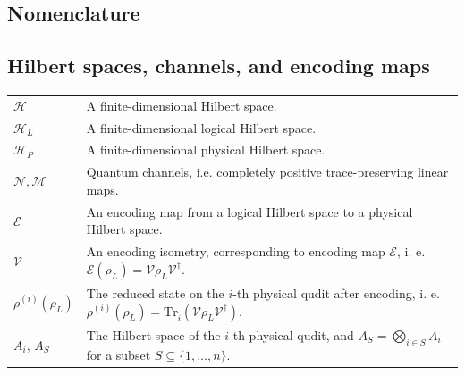 \documentclass[10pt,twocolumn,superscriptaddress,aps,amsmath,amssymb,citeautoscript,floatfix,prx]{revtex4-2}
\theoremstyle{plain}
\theoremstyle{plain}
\theoremstyle{plain}
\theoremstyle{plain}
\theoremstyle{plain}
\theoremstyle{plain}
\theoremstyle{plain}
\theoremstyle{definition}
\theoremstyle{plain}
\begin{document}
\begin{appendix}

\section*{Nomenclature}\label{sec:notation}
\subsection*{Hilbert spaces, channels, and encoding maps}

\begin{tabular}{@{}ll@{}}

\parbox[t]{0.22\textwidth}{$\mathcal{H}$} & \parbox[t]{0.72\textwidth}{A finite-dimensional Hilbert space.} \\[0.6em]

\parbox[t]{0.22\textwidth}{$\mathcal{H}_L$} & \parbox[t]{0.72\textwidth}{A finite-dimensional logical Hilbert space.} \\[0.6em]

\parbox[t]{0.22\textwidth}{$\mathcal{H}_P$} & \parbox[t]{0.72\textwidth}{A finite-dimensional physical Hilbert space.} \\[0.6em]

\parbox[t]{0.22\textwidth}{$\mathcal{N}, \mathcal{M}$} & \parbox[t]{0.72\textwidth}{Quantum channels, i.e. completely positive trace-preserving linear maps.} \\[0.6em]

\parbox[t]{0.22\textwidth}{$\mathcal{E}$} & \parbox[t]{0.72\textwidth}{An encoding map from a logical Hilbert space to a physical Hilbert space.} \\[0.6em]

\parbox[t]{0.22\textwidth}{$\mathcal{V}$} & \parbox[t]{0.72\textwidth}{An encoding isometry, corresponding to encoding map $\mathcal{E}$, i. e. $\mathcal{E}(\rho_L)=\mathcal{V}\rho_L\mathcal{V}^{\dagger}$.} \\[0.6em]

\parbox[t]{0.22\textwidth}{$\rho^{(i)}(\rho_L)$} & \parbox[t]{0.72\textwidth}{The reduced state on the $i$-th physical qudit after encoding, i. e. $\rho^{(i)}(\rho_L)=\mathrm{Tr}_{\hat{i}}(\mathcal{V}\rho_L\mathcal{V}^{\dagger})$.} \\[0.6em]

\parbox[t]{0.22\textwidth}{$A_i$, $A_S$} & \parbox[t]{0.72\textwidth}{The Hilbert space of the $i$-th physical qudit, and $A_S=\bigotimes_{i\in S}A_i$ for a subset $S\subseteq\{1,\ldots,n\}$.} \\[0.6em]


\end{tabular}
\end{appendix}
\end{document}
